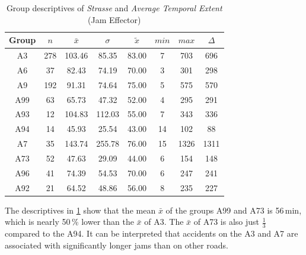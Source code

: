 \begin{table}[ht]
	\tiny
	\centering
	\begin{tabular}{c|c|c|c|c|c|c|c}
		\toprule
		Group & $n$ & $\bar{x}$ & $\sigma$ & $\tilde{x}$ & $min$ & $max$ & $\Delta$ \\
		\midrule
		A3   & 278 & 103.46 & 85.35  & 83.00 & 7  & 703  & 696 \\ 
		A6   & 37  & 82.43  & 74.19  & 70.00 & 3  & 301  & 298 \\ 
		A9   & 192 & 91.31  & 74.64  & 75.00 & 5  & 575  & 570 \\ 
		A99  & 63  & 65.73  & 47.32  & 52.00 & 4  & 295  & 291 \\ 
		A93  & 12  & 104.83 & 112.03 & 55.00 & 7  & 343  & 336 \\ 
		A94  & 14  & 45.93  & 25.54  & 43.00 & 14 & 102  & 88 \\ 
		A7   & 35  & 143.74 & 255.78 & 76.00 & 15 & 1326 & 1311 \\ 
		A73  & 52  & 47.63  & 29.09  & 44.00 & 6  & 154  & 148 \\ 
		A96  & 41  & 74.39  & 54.53  & 70.00 & 6  & 247  & 241 \\ 
		A92  & 21  & 64.52  & 48.86  & 56.00 & 8  & 235  & 227 \\ 
		\bottomrule
	  \end{tabular}
    \caption{Group descriptives of \textit{Strasse} and \textit{Average Temporal Extent} (Jam Effector)}
    \label{tbl:descriptives_baysis_effector_Strasse_TAvg}
\end{table}
The descriptives in \cref{tbl:descriptives_baysis_effector_Strasse_TAvg} show that the mean $\bar{x}$ of the groups A99 and A73 is 56\,min, which is nearly 50\,\% lower than the $\bar{x}$ of A3. The $\bar{x}$ of A73 is also just $\frac{1}{3}$ compared to the A94. It can be interpreted that accidents on the A3 and A7 are associated with significantly longer jams than on other roads.


